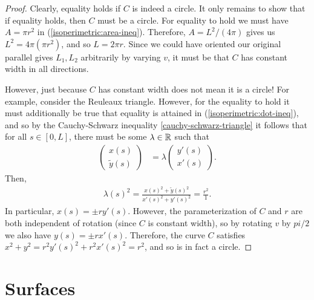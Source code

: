 \begin{proof}
    Clearly, equality holds if $C$ is indeed a circle. It only remains to show that if equality holds, then $C$ must be a circle. For equality to hold we must have $A = \pi r^2$ in (\ref{isoperimetric:area-ineq}). Therefore, $A = L^2/(4\pi)$ gives us $L^2 = 4\pi(\pi r^2)$, and so $L = 2\pi r$. Since we could have oriented our original parallel gives $L_1, L_2$ arbitrarily by varying $v$, it must be that $C$ has constant width in all directions.

    However, just because $C$ has constant width does not mean it is a circle! For example, consider the Reuleaux triangle. However, for the equality to hold it must additionally be true that equality is attained in (\ref{isoperimetric:dot-ineq}), and so by the Cauchy-Schwarz inequality \ref{cauchy-schwarz-triangle} it follows that for all $s \in [0, L]$, there must be some $\lambda \in \mathbb{R}$ such that
    \begin{align*}
        \begin{pmatrix}
            x(s) \\ \tilde{y}(s)
        \end{pmatrix} &= \lambda\begin{pmatrix}
            y'(s) \\ x'(s)
        \end{pmatrix}.
    \end{align*}
    Then,
    \begin{align*}
        \lambda(s)^2 = \frac{x(s)^2 + \tilde{y}(s)^2}{x'(s)^2 + y'(s)^2} = \frac{r^2}{1}.
    \end{align*}
    In particular, $x(s) = \pm r y'(s)$. However, the parameterization of $C$ and $r$ are both independent of rotation (since $C$ is constant width), so by rotating $v$ by $pi/2$ we also have $y(s) = \pm r x'(s)$. Therefore, the curve $C$ satisfies $x^2 + y^2 = r^2y'(s)^2 + r^2x'(s)^2 = r^2$, and so is in fact a circle.
\end{proof}

\section{Surfaces}

